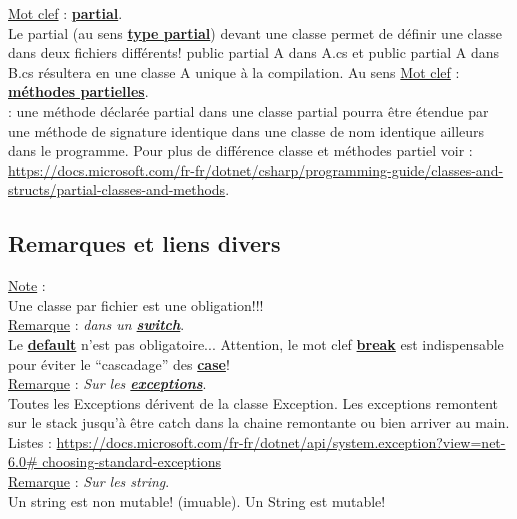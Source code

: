 \documentclass[a4paper,12pt,twoside]{article}
\newcommand{\urlcolor}{magenta}  %
\newcommand{\keycolor}{purple} %
\newcommand{\incode}[1]{{\footnotesize\ttfamily #1}} %
\newcommand{\rem}[2]{\noindent\underline{Remarque} : \textit{#1}.\\ \indent #2}
\newcommand{\note}[1]{\noindent\underline{Note} : \\ \indent #1}
\newcommand{\keyref}[2]{\hypersetup{urlcolor=\keycolor} \href{#1}{\textbf{#2}}\hypersetup{urlcolor=\urlcolor}}
\newcommand{\keyword}[3]{\noindent\underline{Mot clef} : \keyref{#1}{#2}. \\ \indent #3}
\begin{document}
\keyword{https://docs.microsoft.com/fr-fr/dotnet/csharp/programming-guide/classes-and-structs/partial-classes-and-methods}{partial}{Le \incode{partial} (au sens \keyref{https://docs.microsoft.com/fr-fr/dotnet/csharp/language-reference/keywords/partial-type}{type partial}) devant une classe permet de définir une classe dans deux fichiers différents! public partial A dans A.cs et public partial A dans B.cs résultera en une classe A unique à la compilation. Au sens \keyword{https://docs.microsoft.com/fr-fr/dotnet/csharp/language-reference/keywords/partial-method}{méthodes partielles}: une méthode déclarée \incode{partial} dans une classe \incode{partial} pourra être étendue par une méthode de signature identique dans une classe de nom identique ailleurs dans le programme. Pour plus de différence classe et méthodes partiel voir : \url{https://docs.microsoft.com/fr-fr/dotnet/csharp/programming-guide/classes-and-structs/partial-classes-and-methods}.}\\


\subsection{Remarques et liens divers}

\note{Une classe par fichier est une obligation!!!}\\

\rem{dans un \keyref{https://docs.microsoft.com/fr-fr/dotnet/csharp/language-reference/operators/switch-expression}{switch}}{Le \keyref{https://docs.microsoft.com/fr-fr/dotnet/csharp/language-reference/keywords/default}{default} n'est pas obligatoire... Attention, le mot clef \keyref{https://docs.microsoft.com/fr-fr/dotnet/csharp/language-reference/statements/jump-statements\#the-break-statement}{break} est indispensable pour éviter le ``cascadage'' des \keyref{https://docs.microsoft.com/fr-fr/dotnet/csharp/language-reference/statements/selection-statements}{case}!}\\

\rem{Sur les \keyref{https://docs.microsoft.com/fr-fr/dotnet/csharp/fundamentals/exceptions/}{exceptions}}{Toutes les Exceptions dérivent de la classe Exception. Les exceptions remontent sur le stack jusqu'à être catch dans la chaine remontante ou bien arriver au main. Listes : \url{https://docs.microsoft.com/fr-fr/dotnet/api/system.exception?view=net-6.0\# choosing-standard-exceptions}}\\

\rem{Sur les string}{Un \incode{string} est non mutable! (imuable). Un \incode{String} est mutable!}\\
\end{document}
